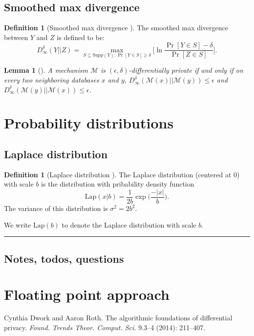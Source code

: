 \documentclass[11pt,a4paper]{article}
\newtheorem{lemma}[theorem]{Lemma}
\theoremstyle{definition}
\newtheorem{definition}[theorem]{Definition}
\newcommand{\horizline}{\noindent\rule{\textwidth}{1pt}}
\newcommand{\Lap}{\mathrm{Lap}}
\newcommand{\M}{\mathcal{M}}
\newcommand{\silvia}[1]{{ {\color{blue}{(silvia)~#1}}}}
\begin{document}
\subsection{Smoothed max divergence}
\begin{definition}[Smoothed max divergence \cite{dr14}]
    The smoothed max divergence between $Y$ and $Z$ is defined to be:
    \[
        D^{\delta}_{\infty}(Y||Z) = \max_{S \subseteq \textrm{Supp}(Y): \Pr[Y \in S] \geq \delta} \Big[\ln \dfrac{\Pr[Y \in S]-\delta}{\Pr[Z \in S]} \Big].
    \]
\end{definition}

\begin{lemma}[\cite{dr14}]
    A mechanism $\M$ is $(\epsilon, \delta)$-differentially private if and only if on every two neighboring databases $x$ and $y$, $D_{\infty}^{\delta}(\M(x)||\M(y)) \leq \epsilon$ and $D_{\infty}^{\delta}(\M(y)||\M(x)) \leq \epsilon$.
\end{lemma}


\section{Probability distributions}
\subsection{Laplace distribution}
\begin{definition}[Laplace distribution \cite{dr14}]
    The Laplace distribution (centered at 0) with scale $b$ is the distribution with pribability density function
    \[
        \Lap(x|b) = \dfrac{1}{2b} \exp \Big(\dfrac{-|x|}{b}\Big).
    \]
    The variance of this distribution is $\sigma^2 = 2b^2$. \silvia{Add cumulative def.? Probably not necessary. Discuss anything else we would like to add.}
\end{definition}
We write $\Lap(b)$ to denote the Laplace distribution with scale $b$.

\silvia{Connor, Grace: can you add Geometric and Gaussian?}

\horizline

\subsection{Notes, todos, questions}

\section{Floating point approach}

\begin{thebibliography}{99}

Cynthia Dwork and Aaron Roth. The algorithmic foundations of differential privacy. \textit{Found. Trends Theor. Comput. Sci.} 9.3--4 (2014): 211--407.


\end{thebibliography}
\end{document}
